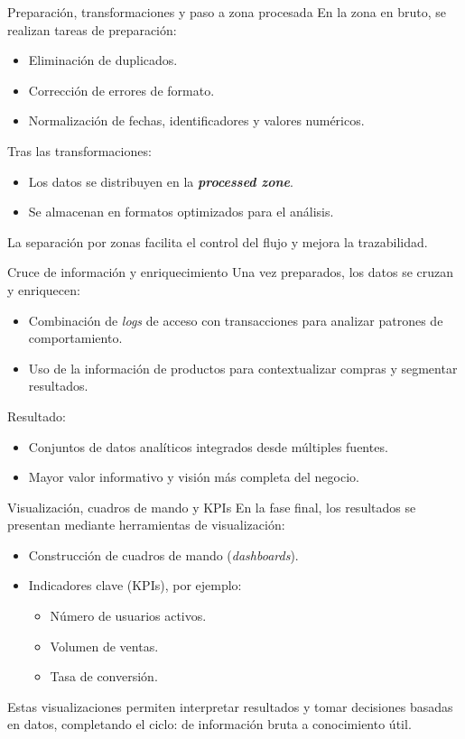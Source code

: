 \documentclass{beamer}
\begin{document}
\begin{frame}{Preparación, transformaciones y paso a zona procesada}
En la zona en bruto, se realizan tareas de preparación:
\begin{itemize}
    \item Eliminación de duplicados.
    \item Corrección de errores de formato.
    \item Normalización de fechas, identificadores y valores numéricos.
\end{itemize}

\medskip
Tras las transformaciones:
\begin{itemize}
    \item Los datos se distribuyen en la \textbf{\textit{processed zone}}.
    \item Se almacenan en formatos optimizados para el análisis.
\end{itemize}

La separación por zonas facilita el control del flujo y mejora la trazabilidad.
\end{frame}

\begin{frame}{Cruce de información y enriquecimiento}
Una vez preparados, los datos se cruzan y enriquecen:
\begin{itemize}
    \item Combinación de \textit{logs} de acceso con transacciones para analizar patrones de comportamiento.
    \item Uso de la información de productos para contextualizar compras y segmentar resultados.
\end{itemize}

\medskip
Resultado:
\begin{itemize}
    \item Conjuntos de datos analíticos integrados desde múltiples fuentes.
    \item Mayor valor informativo y visión más completa del negocio.
\end{itemize}
\end{frame}

\begin{frame}{Visualización, cuadros de mando y KPIs}
En la fase final, los resultados se presentan mediante herramientas de visualización:
\begin{itemize}
    \item Construcción de cuadros de mando (\textit{dashboards}).
    \item Indicadores clave (KPIs), por ejemplo:
    \begin{itemize}
        \item Número de usuarios activos.
        \item Volumen de ventas.
        \item Tasa de conversión.
    \end{itemize}
\end{itemize}

Estas visualizaciones permiten interpretar resultados y tomar decisiones basadas en datos, completando el ciclo: de información bruta a conocimiento útil.
\end{frame}
\end{document}
